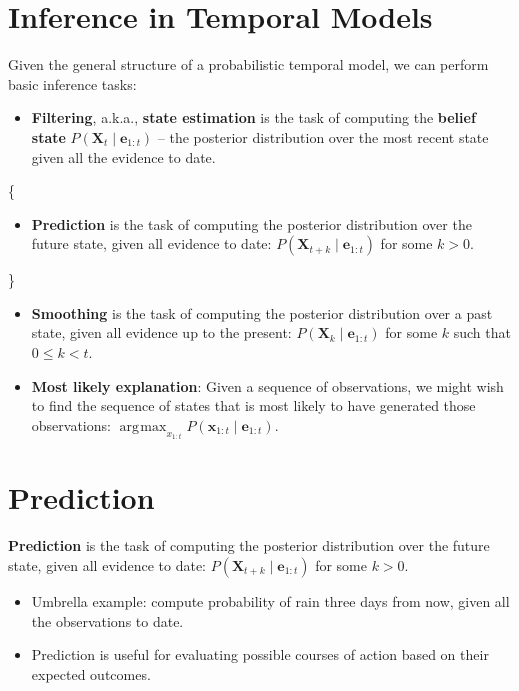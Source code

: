 \documentclass[11pt]{article}
\DeclareMathOperator*{\argmax}{arg\!max}
\begin{document}
\section{Inference in Temporal Models}
\label{sec:org364c54c}

Given the general structure of a probabilistic temporal model, we can perform basic inference tasks:

\begin{itemize}
\item \textbf{Filtering}, a.k.a., \textbf{state estimation} is the task of computing the \textbf{belief state} \(P(\bm{X}_t \mid \bm{e}_{1:t})\) -- the posterior distribution over the most recent state given all the evidence to date.
\end{itemize}

\fbox\{
\begin{minipage}{\textwidth}
\begin{itemize}
\item {\bf Prediction} is the task of computing the posterior distribution over the future state, given all evidence to date: $P(\bm{X}_{t+k} \mid \bm{e}_{1:t})$ for some $k > 0$.
\end{itemize}
\end{minipage}
\}
\begin{itemize}
\item \textbf{Smoothing} is the task of computing the posterior distribution over a past state, given all evidence up to the present: \(P(\bm{X}_k \mid \bm{e}_{1:t})\) for some \(k\) such that \(0 \le k < t\).

\item \textbf{Most likely explanation}: Given a sequence of observations, we might wish to find the sequence of states that is most likely to have generated those observations: \(\argmax_{x_{1:t}} P(\bm{x}_{1:t} \mid \bm{e}_{1:t})\).
\end{itemize}
\section{Prediction}
\label{sec:org24210d9}

\textbf{Prediction} is the task of computing the posterior distribution over the future state, given all evidence to date: \(P(\bm{X}_{t+k} \mid \bm{e}_{1:t})\) for some \(k > 0\).

\begin{itemize}
\item Umbrella example: compute probability of rain three days from now, given all the observations to date.
\item Prediction is useful for evaluating possible courses of action based on their expected outcomes.
\end{itemize}
\end{document}
